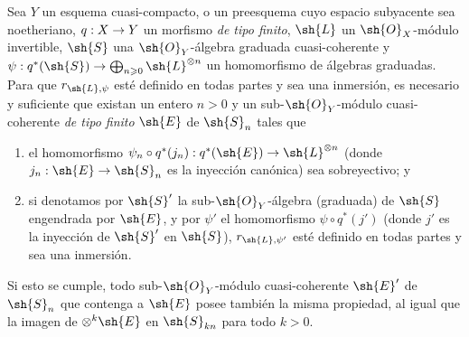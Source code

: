 \documentclass[oneside,10pt]{amsart}
\makeatletter
\renewcommand{\geq}{\geqslant}
\newcommand{\ega@arrow}[2]{\mathchoice{#1}{#2}{#2}{#2}}
\renewcommand{\to}{\ega@arrow{\longrightarrow}{\rightarrow}}
\let\EGAOriginalLabel\label
\renewcommand{\label}[1]{\phantomsection\EGAOriginalLabel{#1}}
\makeatother
\begin{document}
\begin{proposition}[3.8.5]
\label{II.3.8.5}
Sea $Y$ un esquema cuasi-compacto, o un preesquema cuyo espacio subyacente sea noetheriano, $q:X\to Y$ un morfismo \emph{de tipo finito}, $\sh{L}$ un $\sh{O}_X$-módulo invertible, $\sh{S}$ una $\sh{O}_Y$-álgebra graduada cuasi-coherente y $\psi:q^*(\sh{S})\to\bigoplus_{n\geq0}\sh{L}^{\otimes n}$ un homomorfismo de álgebras graduadas.
Para que $r_{\sh{L},\psi}$ esté definido en todas partes y sea una inmersión, es necesario y suficiente que existan un entero $n>0$ y un sub-$\sh{O}_Y$-módulo cuasi-coherente \emph{de tipo finito} $\sh{E}$ de $\sh{S}_n$ tales que
\begin{enumerate}
  \item[\textup{a)}] el homomorfismo $\psi_n\circ q^*(j_n):q^*(\sh{E})\to\sh{L}^{\otimes n}$ (donde $j_n:\sh{E}\to\sh{S}_n$ es la inyección canónica) sea sobreyectivo; y
  \item[\textup{b)}] si denotamos por $\sh{S}'$ la sub-$\sh{O}_Y$-álgebra (graduada) de $\sh{S}$ engendrada por $\sh{E}$, y por $\psi'$ el homomorfismo $\psi\circ q^*(j')$ (donde $j'$ es la inyección de $\sh{S}'$ en $\sh{S}$), $r_{\sh{L},\psi'}$ esté definido en todas partes y sea una inmersión.
\end{enumerate}

Si esto se cumple, todo sub-$\sh{O}_Y$-módulo cuasi-coherente $\sh{E}'$ de $\sh{S}_n$ que contenga a $\sh{E}$ posee también la misma propiedad, al igual que la imagen de $\otimes^k\sh{E}$ en $\sh{S}_{kn}$ para todo $k>0$.
\end{proposition}
\end{document}
